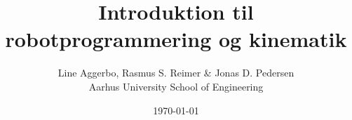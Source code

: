 

\title{ \textbf{Introduktion til robotprogrammering og kinematik} }

\author{ Line Aggerbo, Rasmus S. Reimer \& Jonas D. Pedersen\\
	Aarhus University School of Engineering}
\date{\today}




\maketitle

\clearpage

\tableofcontents

\clearpage








